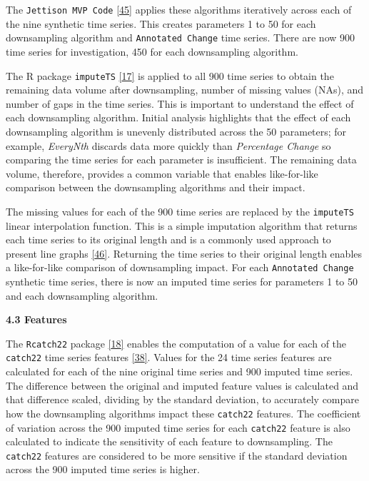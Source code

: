 \documentclass{article}
\begin{document}
The \texttt{Jettison\ MVP\ Code}
\protect\hyperlink{ref-Jettison}{{[}45{]}} applies these algorithms
iteratively across each of the nine synthetic time series. This creates
parameters 1 to 50 for each downsampling algorithm and
\texttt{Annotated\ Change} time series. There are now 900 time series
for investigation, 450 for each downsampling algorithm.

The R package \texttt{imputeTS}
\protect\hyperlink{ref-imputeTS_R}{{[}17{]}} is applied to all 900 time
series to obtain the remaining data volume after downsampling, number of
missing values (NAs), and number of gaps in the time series. This is
important to understand the effect of each downsampling algorithm.
Initial analysis highlights that the effect of each downsampling
algorithm is unevenly distributed across the 50 parameters; for example,
\emph{EveryNth} discards data more quickly than \emph{Percentage Change}
so comparing the time series for each parameter is insufficient. The
remaining data volume, therefore, provides a common variable that
enables like-for-like comparison between the downsampling algorithms and
their impact.

The missing values for each of the 900 time series are replaced by the
\texttt{imputeTS} linear interpolation function. This is a simple
imputation algorithm that returns each time series to its original
length and is a commonly used approach to present line graphs
\protect\hyperlink{ref-compressiontech}{{[}46{]}}. Returning the time
series to their original length enables a like-for-like comparison of
downsampling impact. For each \texttt{Annotated\ Change} synthetic time
series, there is now an imputed time series for parameters 1 to 50 and
each downsampling algorithm.

\textbf{4.3 Features}

The \texttt{Rcatch22} package
\protect\hyperlink{ref-catch22_R}{{[}18{]}} enables the computation of a
value for each of the \texttt{catch22} time series features
\protect\hyperlink{ref-catch22}{{[}38{]}}. Values for the 24 time series
features are calculated for each of the nine original time series and
900 imputed time series. The difference between the original and imputed
feature values is calculated and that difference scaled, dividing by the
standard deviation, to accurately compare how the downsampling
algorithms impact these \texttt{catch22} features. The coefficient of
variation across the 900 imputed time series for each \texttt{catch22}
feature is also calculated to indicate the sensitivity of each feature
to downsampling. The \texttt{catch22} features are considered to be more
sensitive if the standard deviation across the 900 imputed time series
is higher.
\end{document}
